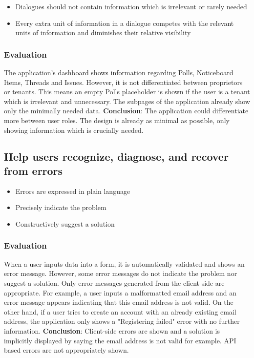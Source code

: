 \begin{itemize}
    \item Dialogues should not contain information which is irrelevant or rarely needed
    \item Every extra unit of information in a dialogue competes with the relevant units of information and diminishes their relative visibility
\end{itemize}

\subsubsection{Evaluation}
The application's dashboard shows information regarding Polls, Noticeboard Items, Threads and Issues. However, it is not differentiated between proprietors or tenants. This means an empty Polls placeholder is shown if the user is a tenant which is irrelevant and unnecessary. The subpages of the application already show only the minimally needed data. \textbf{Conclusion}: The application could differentiate more between user roles. The design is already as minimal as possible, only showing information which is crucially needed.

\subsection{Help users recognize, diagnose, and recover from errors}

\begin{itemize}
    \item Errors are expressed in plain language
    \item Precisely indicate the problem
    \item Constructively suggest a solution 
\end{itemize}

\subsubsection{Evaluation}
When a user inputs data into a form, it is automatically validated and shows an error message. However, some error messages do not indicate the problem nor suggest a solution. Only error messages generated from the client-side are appropriate. For example, a user inputs a malformatted email address and an error message appears indicating that this email address is not valid. On the other hand, if a user tries to create an account with an already existing email address, the application only shows a "Registering failed" error with no further information. \textbf{Conclusion}: Client-side errors are shown and a solution is implicitly displayed by saying the email address is not valid for example. API based errors are not appropriately shown.  

